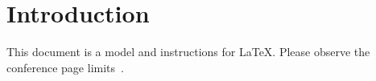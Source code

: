 \section{Introduction}
This document is a model and instructions for \LaTeX.
Please observe the conference page limits~\cite{jin2021flexible}.

